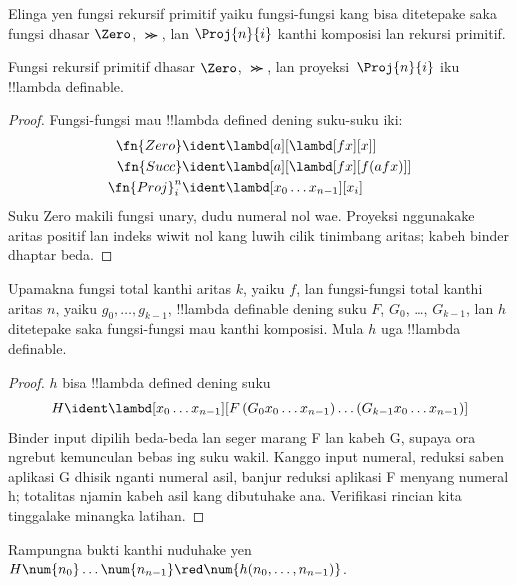 \documentclass[../../../include/open-logic-section]{subfiles}
\begin{document}

Elinga yen fungsi rekursif primitif yaiku fungsi-fungsi kang bisa
ditetepake saka fungsi dhasar $\Zero$, $\Succ$, lan $\Proj{n}{i}$
kanthi komposisi lan rekursi primitif.

\begin{lem}
  Fungsi rekursif primitif dhasar $\Zero$, $\Succ$, lan
  proyeksi~$\Proj{n}{i}$ iku !!{lambda definable}.
\end{lem}

\begin{proof}
Fungsi-fungsi mau !!{lambda define}d dening suku-suku iki:
\begin{align*}
  \fn{Zero} & \ident \lambd[a][\lambd[fx][x]]\\
  \fn{Succ} & \ident \lambd[a][\lambd[fx][f (a f x)]] \\
  \fn{Proj}^n_i & \ident \lambd[x_0\dots x_{n-1}][x_i]
\end{align*}
Suku Zero makili fungsi unary, dudu numeral nol wae. Proyeksi nggunakake aritas positif lan indeks wiwit nol kang luwih cilik tinimbang aritas; kabeh binder dhaptar beda.\end{proof}

\begin{lem}
   Upamakna fungsi total kanthi aritas $k$, yaiku $f$,
  lan fungsi-fungsi total kanthi aritas $n$, yaiku $g_0, \dots, g_{k-1}$,
  !!{lambda definable} dening suku $F$, $G_0$, \dots, $G_{k-1}$,
  lan $h$ ditetepake saka fungsi-fungsi mau kanthi komposisi.
  Mula $h$ uga !!{lambda definable}.
\end{lem}

\begin{proof}
  $h$ bisa !!{lambda define}d dening suku
  \[
  H \ident \lambd[x_0 \dots x_{n-1}][F\, (G_0 x_0 \dots
    x_{n-1}) \dots (G_{k-1} x_0 \dots x_{n-1})]
  \]
  Binder input dipilih beda-beda lan seger marang F lan kabeh G, supaya ora ngrebut kemunculan bebas ing suku wakil. Kanggo input numeral, reduksi saben aplikasi G dhisik nganti numeral asil, banjur reduksi aplikasi F menyang numeral h; totalitas njamin kabeh asil kang dibutuhake ana. Verifikasi rincian kita tinggalake minangka latihan.
\end{proof}

\begin{prob}
  Rampungna bukti  kanthi nuduhake
  yen $H\num{n_0}\dots\num{n_{n-1}} \red \num{h(n_0, \dots,
    n_{n-1})}$.
\end{prob}
\end{document}
